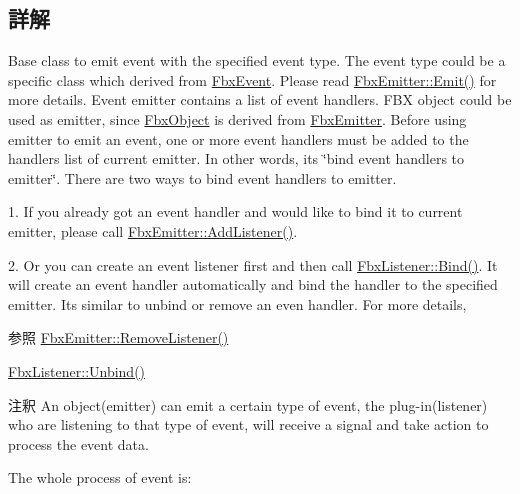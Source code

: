 \subsection{詳解}
Base class to emit event with the specified event type. The event type could be a specific class which derived from \hyperlink{class_fbx_event}{Fbx\+Event}. Please read \hyperlink{class_fbx_emitter_ad541e3b06c0beeab71fcf066fc44c78d}{Fbx\+Emitter\+::\+Emit()} for more details. Event emitter contains a list of event handlers. F\+BX object could be used as emitter, since \hyperlink{class_fbx_object}{Fbx\+Object} is derived from \hyperlink{class_fbx_emitter}{Fbx\+Emitter}. Before using emitter to emit an event, one or more event handlers must be added to the handlers list of current emitter. In other words, it\textquotesingle{}s \char`\"{}bind event handlers to emitter\char`\"{}. There are two ways to bind event handlers to emitter. \begin{DoxyItemize}
\item 1. If you already got an event handler and would like to bind it to current emitter, please call \hyperlink{class_fbx_emitter_ab8022a1fd620467f12f493673cfa16a9}{Fbx\+Emitter\+::\+Add\+Listener()}. \item 2. Or you can create an event listener first and then call \hyperlink{class_fbx_listener_a7a3298b1f4fa347aaa2cb5136265a178}{Fbx\+Listener\+::\+Bind()}. It will create an event handler automatically and bind the handler to the specified emitter. It\textquotesingle{}s similar to unbind or remove an even handler. For more details, \begin{DoxySeeAlso}{参照}
\hyperlink{class_fbx_emitter_a9d5e8f773a85bd9f7a88d9f01eb5463d}{Fbx\+Emitter\+::\+Remove\+Listener()} 

\hyperlink{class_fbx_listener_a723ba6f82b533e427d72ab39da3f8aeb}{Fbx\+Listener\+::\+Unbind()} 
\end{DoxySeeAlso}
\begin{DoxyRemark}{注釈}
An object(emitter) can emit a certain type of event, the plug-\/in(listener) who are listening to that type of event, will receive a signal and take action to process the event data. 
\end{DoxyRemark}
\begin{DoxyParagraph}{The whole process of event is\+:}


\end{DoxyParagraph}
\end{DoxyItemize}
